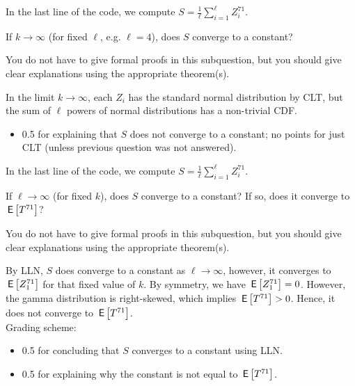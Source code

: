 \vspace*{20pt}



\begin{exercise}[0.5]
In the last line of the code, we compute $S = \frac1{\ell}\sum_{i=1}^{\ell} Z_i^{71}$.

 If $k \to \infty$ (for fixed $\ell$, e.g. $\ell=4$), does $S$ converge to a constant? 

You do not have to give formal proofs in this subquestion, but you should give clear explanations using the appropriate theorem(s). 
\begin{solution}
In the limit $k \to \infty$, each $Z_i$ has the standard normal distribution by CLT, but the sum of $\ell$ powers of normal distributions has a non-trivial CDF. \\
\begin{itemize}
\item 0.5 for explaining that $S$ does not converge to a constant; no points for just CLT (unless previous question was not answered).
\end{itemize}
\end{solution}
\end{exercise}



\vspace*{20pt}



\begin{exercise}[1]
In the last line of the code, we compute $S = \frac1{\ell}\sum_{i=1}^{\ell} Z_i^{71}$.

If $\ell \to \infty$ (for fixed $k$), does $S$ converge to a constant? 
If so, does it converge to $\,\mathsf{E}\left[T^{71}\right]$?

You do not have to give formal proofs in this subquestion, but you should give clear explanations using the appropriate theorem(s). 
\begin{solution}
By LLN, $S$ does converge to a constant as  $\ell \to \infty$, however, it converges to $\,\mathsf{E}\left[Z_1^{71}\right]$ for that fixed value of $k$. By symmetry, we have  $\,\mathsf{E}\left[Z_1^{71}\right] = 0$. However, the gamma distribution is right-skewed, which implies $\,\mathsf{E}\left[T^{71}\right] > 0$. Hence, it does not converge to $\,\mathsf{E}\left[T^{71}\right]$. \\
Grading scheme:
\begin{itemize}
\item 0.5 for concluding that $S$ converges to a constant using LLN.
\item 0.5 for explaining why the constant is not equal to $\,\mathsf{E}\left[T^{71}\right]$.
\end{itemize}
\end{solution}
\end{exercise}

